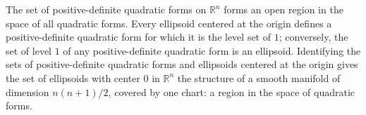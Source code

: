 The set of positive-definite quadratic forms on $\mathbb{R}^n$ forms an open region in the space of all quadratic forms. Every ellipsoid centered at the origin defines a positive-definite quadratic form for which it is the level set of $1$; conversely, the set of level $1$ of any positive-definite quadratic form is an ellipsoid. Identifying the sets of positive-definite quadratic forms and ellipsoids centered at the origin gives the set of ellipsoids with center $0$ in $\mathbb{R}^n$ the structure of a smooth manifold of dimension $n(n+1)/2$, covered by one chart: a region in the space of quadratic forms.
